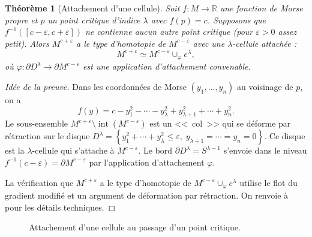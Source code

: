 \documentclass[12pt,a4paper,openany]{book}
\theoremstyle{definition}
\theoremstyle{plain}
\newtheorem{theoreme}[definition]{Théorème}
\theoremstyle{remark}
\newcommand{\R}{\mathbb{R}}
\newcommand{\set}[1]{\left\{#1\right\}}
\begin{document}
\begin{theoreme}[Attachement d'une cellule]\label{thm:morse-attachement}
Soit $f : M \to \R$ une fonction de Morse propre et $p$ un point critique
d'indice $\lambda$ avec $f(p) = c$. Supposons que $f^{-1}([c-\varepsilon, c+\varepsilon])$
ne contienne aucun autre point critique (pour $\varepsilon > 0$ assez petit).
Alors $M^{c+\varepsilon}$ a le type d'homotopie de $M^{c-\varepsilon}$ avec une
$\lambda$-cellule attachée :
\[
  M^{c+\varepsilon} \simeq M^{c-\varepsilon} \cup_\varphi e^\lambda,
\]
où $\varphi : \partial D^\lambda \to \partial M^{c-\varepsilon}$ est une
application d'attachement convenable.
\end{theoreme}

\begin{proof}[Idée de la preuve]
Dans les coordonnées de Morse $(y_1, \ldots, y_n)$ au voisinage de $p$, on a
\[
  f(y) = c - y_1^2 - \cdots - y_\lambda^2 + y_{\lambda+1}^2 + \cdots + y_n^2.
\]
Le sous-ensemble $M^{c+\varepsilon} \setminus \operatorname{int}(M^{c-\varepsilon})$
est un <<~col~>> qui se déforme par rétraction sur le disque
$D^\lambda = \set{y_1^2 + \cdots + y_\lambda^2 \leqslant \varepsilon, \; y_{\lambda+1} = \cdots = y_n = 0}$.
Ce disque est la $\lambda$-cellule qui s'attache à $M^{c-\varepsilon}$. Le bord
$\partial D^\lambda = S^{\lambda-1}$ s'envoie dans le niveau
$f^{-1}(c-\varepsilon) = \partial M^{c-\varepsilon}$ par l'application
d'attachement $\varphi$.

La vérification que $M^{c+\varepsilon}$ a le type d'homotopie de
$M^{c-\varepsilon} \cup_\varphi e^\lambda$ utilise le flot du gradient modifié
et un argument de déformation par rétraction. On renvoie à
\cite{MilnorMorse} pour les détails techniques.
\end{proof}

\begin{figure}[ht]
\centering
{}
\caption{Attachement d'une cellule au passage d'un point critique.}
\label{fig:morse-attachement}
\end{figure}
\end{document}
